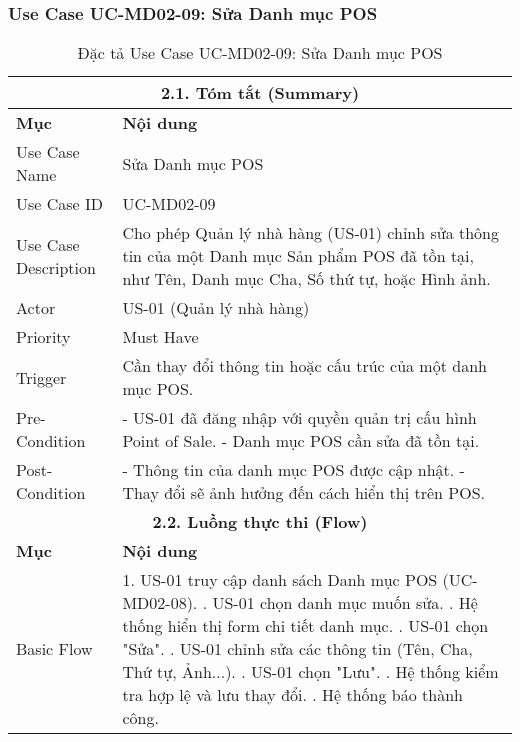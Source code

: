 \subsubsection{Use Case UC-MD02-09: Sửa Danh mục POS}

\begin{longtable}{|m{4cm}|p{11cm}|}
\caption{Đặc tả Use Case UC-MD02-09: Sửa Danh mục POS} \label{tab:uc_md02_09_revised} \\
\hline
\multicolumn{2}{|c|}{\textbf{2.1. Tóm tắt (Summary)}} \\
\hline
\textbf{Mục} & \textbf{Nội dung} \\
\hline
\endhead %
\hline
\endfoot %
\hline
\endlastfoot %
Use Case Name & Sửa Danh mục POS \\
\hline
Use Case ID & UC-MD02-09 \\
\hline
Use Case Description & Cho phép Quản lý nhà hàng (US-01) chỉnh sửa thông tin của một Danh mục Sản phẩm POS đã tồn tại, như Tên, Danh mục Cha, Số thứ tự, hoặc Hình ảnh. \\
\hline
Actor & US-01 (Quản lý nhà hàng) \\
\hline
Priority & Must Have \\
\hline
Trigger & Cần thay đổi thông tin hoặc cấu trúc của một danh mục POS. \\
\hline
Pre-Condition & - US-01 đã đăng nhập với quyền quản trị cấu hình Point of Sale. \newline - Danh mục POS cần sửa đã tồn tại. \\
\hline
Post-Condition & - Thông tin của danh mục POS được cập nhật. \newline - Thay đổi sẽ ảnh hưởng đến cách hiển thị trên POS. \\
\hline
\multicolumn{2}{|c|}{\textbf{2.2. Luồng thực thi (Flow)}} \\
\hline
\textbf{Mục} & \textbf{Nội dung} \\
\hline
Basic Flow & 1. US-01 truy cập danh sách Danh mục POS (UC-MD02-08). \newline 2. US-01 chọn danh mục muốn sửa. \newline 3. Hệ thống hiển thị form chi tiết danh mục. \newline 4. US-01 chọn "Sửa". \newline 5. US-01 chỉnh sửa các thông tin (Tên, Cha, Thứ tự, Ảnh...). \newline 6. US-01 chọn "Lưu". \newline 7. Hệ thống kiểm tra hợp lệ và lưu thay đổi. \newline 8. Hệ thống báo thành công. \\

\end{longtable}
